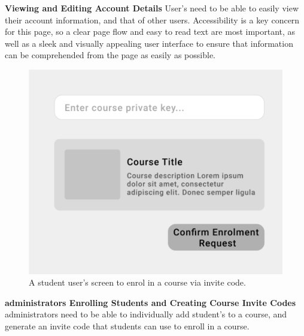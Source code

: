 \textbf{Viewing and Editing Account Details}
User's need to be able to easily view their account information, and that of other users. Accessibility is a key concern for this page, so a clear page flow and easy to read text are most important, as well as a sleek and visually appealing user interface to ensure that information can be comprehended from the page as easily as possible.

\begin{figure}[h!]
  \centering
  \includegraphics[scale=0.4]{images/accounts-code}
  \caption{A student user's screen to enrol in a course via invite code.}
\end{figure}

\textbf{administrators Enrolling Students and Creating Course Invite Codes}
administrators need to be able to individually add student's to a course, and generate an invite code that students can use to enroll in a course. 

